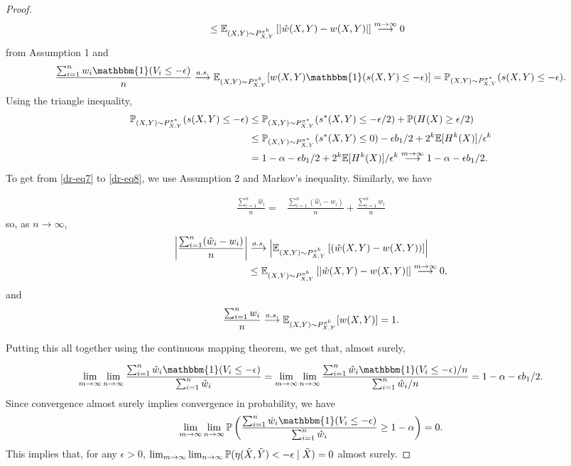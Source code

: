 \begin{proof}
\begin{align}
    &\leq \mathbb{E}_{(X,Y)\sim P^{\pi^b}_{X,Y}}\left[ |\hat{w}(X, Y) - w(X,Y)|\right] \overset{m \rightarrow \infty}{\longrightarrow} 0
\end{align}
from Assumption 1 and
\begin{align}
    \frac{\sum_{i=1}^n w_i \mathbbm{1}(V_i \leq - \epsilon) }{n} \overset{a.s.}{\longrightarrow} \expb[w(X,Y) \mathbbm{1}(s(X,Y) \leq -\epsilon)] = \tarprob(s(X,Y) \leq -\epsilon).
\end{align}
Using the triangle inequality,
\begin{align}
    \mathbb{P}_{(X,Y)\sim P^{\pi^*}_{X,Y}}(s(X,Y) \leq -\epsilon) &\leq \mathbb{P}_{(X,Y)\sim P^{\pi^*}_{X,Y}}(s^*(X,Y) \leq -\epsilon/2) + \mathbb{P}(H(X) \geq \epsilon/2) \label{dr-eq7} \\
    &\leq \mathbb{P}_{(X,Y)\sim P^{\pi^*}_{X,Y}}(s^*(X,Y) \leq 0) - \epsilon b_1/2 + 2^k\mathbb{E}[H^k(X)]/\epsilon^k \label{dr-eq8} \\
    &= 1- \alpha - \epsilon b_1/2 + 2^k\mathbb{E}[H^k(X)]/\epsilon^k \overset{m \rightarrow \infty}{\longrightarrow} 1- \alpha - \epsilon b_1/2. \nonumber
\end{align}
To get from \eqref{dr-eq7} to \eqref{dr-eq8}, we use Assumption 2 and Markov's inequality. Similarly, we have

\begin{align}
    \frac{\sum_{i=1}^n \hat{w}_i}{n} =& \frac{\sum_{i=1}^n (\hat{w}_i - w_i)}{n} + \frac{\sum_{i=1}^n w_i }{n} \nonumber
\end{align}
so, as $n \rightarrow \infty$, 
\begin{align}
    \left| \frac{\sum_{i=1}^n (\hat{w}_i - w_i) }{n}\right| &\overset{a.s.}{\longrightarrow} \left|\mathbb{E}_{(X,Y)\sim P^{\pi^b}_{X,Y}}\left[ (\hat{w}(X, Y) - w(X,Y))\right]\right| \nonumber\\
    &\leq \mathbb{E}_{(X,Y)\sim P^{\pi^b}_{X,Y}}\left[ |\hat{w}(X, Y) - w(X,Y)|\right] \overset{m \rightarrow \infty}{\longrightarrow} 0,
\end{align}
and
\begin{align}
    \frac{\sum_{i=1}^n w_i }{n} \overset{a.s.}{\longrightarrow} \mathbb{E}_{(X,Y)\sim P^{\pi^b}_{X,Y}}[w(X,Y)] = 1.
\end{align}

Putting this all together using the continuous mapping theorem, we get that, almost surely,

\begin{align}
\lim_{m \rightarrow \infty} \lim_{n \rightarrow \infty} \frac{\sum_{i=1}^n \hat{w}_i \mathbbm{1}(V_i \leq - \epsilon) }{\sum_{i=1}^n \hat{w}_i} = \lim_{m \rightarrow \infty} \lim_{n \rightarrow \infty} \frac{\sum_{i=1}^n \hat{w}_i \mathbbm{1}(V_i \leq - \epsilon)/n }{\sum_{i=1}^n \hat{w}_i/n} = 1- \alpha - \epsilon b_1/2.
\end{align}
Since convergence almost surely implies convergence in probability, we have
\begin{align}
    \lim_{m \rightarrow \infty} \lim_{n \rightarrow \infty} \p \left( \frac{\sum_{i=1}^n \hat{w}_i \mathbbm{1}(V_i \leq - \epsilon) }{\sum_{i=1}^n \hat{w}_i} \geq 1 - \alpha \right) = 0.
\end{align}
This implies that, for any $\epsilon > 0$, $\lim_{m \rightarrow \infty} \lim_{n \rightarrow \infty} \mathbb{P}(\eta(\tilde{X}, \tilde{Y}) < -\epsilon \mid \tilde{X}) = 0$ almost surely.



\end{proof}
